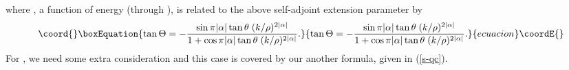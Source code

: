 \documentclass[a4paper,aps,eqsecnum,preprint,preprintnumbers,12pt]{revtex4}
\begin{document}
where \coordHE{}, a function of energy \coordHE{} (through \coordHE{} ), is related to the
above self-adjoint extension parameter by
\begin{equation}\coord{}\boxEquation{ \label{cthetas}
\tan\Theta = - \frac{ \sin\pi|\alpha| \tan\theta \;
(k/\rho)^{2|\alpha|} }{ 1 + \cos\pi|\alpha| \tan\theta \;
(k/\rho)^{2|\alpha|} }.
}{ \tan\Theta = - \frac{ \sin\pi|\alpha| \tan\theta \;
(k/\rho)^{2|\alpha|} }{ 1 + \cos\pi|\alpha| \tan\theta \;
(k/\rho)^{2|\alpha|} }.
}{ecuacion}\coordE{}\end{equation}
For \coordHE{}, we need some extra
consideration and this case is covered by our another formula,
given in (\ref{s-qc}).
\end{document}
